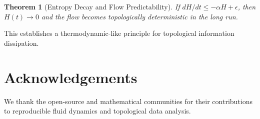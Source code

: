 \documentclass[11pt]{article}
\newtheorem{theorem}{Theorem}[section]
\theoremstyle{definition}
\begin{document}
\begin{theorem}[Entropy Decay and Flow Predictability]
If $dH/dt \leq -\alpha H + \epsilon$, then $H(t) \to 0$ and the flow becomes topologically deterministic in the long run.
\end{theorem}

This establishes a thermodynamic-like principle for topological information dissipation.



\section*{Acknowledgements}
We thank the open-source and mathematical communities for their contributions to reproducible fluid dynamics and topological data analysis.
\end{document}
